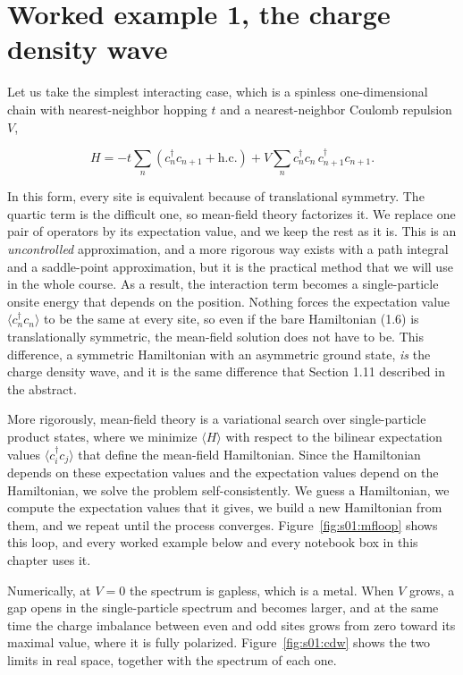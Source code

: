 \section{Worked example 1, the charge density wave}

Let us take the simplest interacting case, which is a spinless one-dimensional chain with
nearest-neighbor hopping $t$ and a nearest-neighbor Coulomb repulsion $V$,

\begin{equation}
H = -t\sum_n \left(c_n^\dagger c_{n+1} + \text{h.c.}\right) + V\sum_n c_n^\dagger c_n\, c_{n+1}^\dagger c_{n+1}.
\end{equation}

In this form, every site is equivalent because of translational symmetry. The quartic term is the
difficult one, so mean-field theory factorizes it. We replace one pair of operators by its
expectation value, and we keep the rest as it is. This is an \emph{uncontrolled} approximation, and
a more rigorous way exists with a path integral and a saddle-point approximation, but it is the
practical method that we will use in the whole course. As a result, the interaction term becomes a
single-particle onsite energy that depends on the position. Nothing forces the expectation value
$\langle c_n^\dagger c_n\rangle$ to be the same at every site, so even if the bare Hamiltonian (1.6)
is translationally symmetric, the mean-field solution does not have to be. This difference, a
symmetric Hamiltonian with an asymmetric ground state, \emph{is} the charge density wave, and it is
the same difference that Section 1.11 described in the abstract.

More rigorously, mean-field theory is a variational search over single-particle product
states, where we minimize $\langle H\rangle$ with respect to the bilinear expectation values $\langle
c_i^\dagger c_j\rangle$ that define the mean-field Hamiltonian. Since the Hamiltonian depends on
these expectation values and the expectation values depend on the Hamiltonian, we solve the problem
self-consistently. We guess a Hamiltonian, we compute the expectation values that it gives, we build
a new Hamiltonian from them, and we repeat until the process converges. Figure~\ref{fig:s01:mfloop}
shows this loop, and every worked example below and every notebook box in this chapter uses it.



Numerically, at $V=0$ the spectrum is gapless, which is a metal. When $V$
grows, a gap opens in the single-particle spectrum and becomes larger, and at the same time the
charge imbalance between even and odd sites grows from zero toward its maximal value, where it is
fully polarized. Figure~\ref{fig:s01:cdw} shows the two limits in real space, together with the
spectrum of each one.

